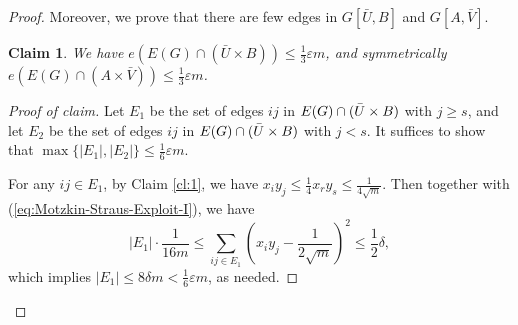 \documentclass[11pt,a4paper]{article}
\newtheorem{claim}[theorem]{Claim}
\theoremstyle{definition}
\theoremstyle{remark}
\newenvironment{poc}{\begin{proof}[Proof of claim]\renewcommand*{\qedsymbol}{$\blacksquare$}}{\end{proof}}
\newcommand*{\abs}[1]{\lvert#1\rvert}
\begin{document}
\begin{proof}
    Moreover, we prove that there are few edges in $G[\bar{U},B]$ and 
    $G[A,\bar{V}]$. 

\begin{claim}\label{cl:3}
    We have $e(E(G) \cap (\bar{U} \times B)) \leq \frac{1}{3} \varepsilon m $, and symmetrically $e(E(G) \cap (A \times \bar{V})) \leq \frac{1}{3} \varepsilon m $.
\end{claim} 
    
    \begin{poc}
        Let $E_1$ be the set of edges $ij$ in $E(G) \cap (\Bar{U} \times B)$ with $j \geq s$, and let $E_2$ be the set of edges $ij$ in $E(G) \cap (\Bar{U} \times B)$ with $j < s$. It suffices to show that $\max\{\abs{E_1}, \abs{E_2}\} \leq 
        \frac{1}{6} \varepsilon m $.

        For any $ij \in E_1$, by Claim \ref{cl:1}, we have $x_i y_j \leq \frac{1}{4} x_r y_s  \leq \frac{1}{4\sqrt{m}}$. Then together with (\ref{eq:Motzkin-Straus-Exploit-I}), we have 
        $$\abs{E_1} \cdot \frac{1}{16 m} \leq \sum_{ij \in E_1} \left(x_i y_j - \frac{1}{2\sqrt{m}} \right)^2 \leq \frac{1}{2}\delta , $$
        which implies $\abs{E_1} \leq 8 \delta m < \frac{1}{6} \varepsilon m $, as needed. 


\end{poc}
\end{proof}
\end{document}
